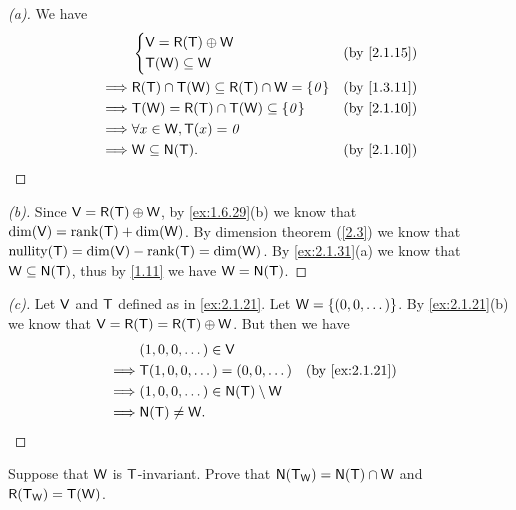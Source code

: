 \begin{proof}[(a)]
	We have
	\begin{align*}
		         & \begin{dcases}
			           \V = \rg{\T} \oplus \W \\
			           \T(\W) \subseteq \W
		           \end{dcases}                                 &  & \by{2.1.15}              \\
		\implies & \rg{\T} \cap \T(\W) \subseteq \rg{\T} \cap \W = \set{\zv} &  & \by{1.3.11} \\
		\implies & \T(\W) = \rg{\T} \cap \T(\W) \subseteq \set{\zv}          &  & \by{2.1.10} \\
		\implies & \forall x \in \W, \T(x) = \zv                                              \\
		\implies & \W \subseteq \ns{\T}.                                     &  & \by{2.1.10}
	\end{align*}
\end{proof}

\begin{proof}[(b)]
	Since \(\V = \rg{\T} \oplus \W\), by \cref{ex:1.6.29}(b) we know that \(\dim(\V) = \rk{\T} + \dim(\W)\).
	By dimension theorem (\cref{2.3}) we know that \(\nt{\T} = \dim(\V) - \rk{\T} = \dim(\W)\).
	By \cref{ex:2.1.31}(a) we know that \(\W \subseteq \ns{\T}\), thus by \cref{1.11} we have \(\W = \ns{\T}\).
\end{proof}

\begin{proof}[(c)]
	Let \(\mathsf{V}\) and \(\mathsf{T}\) defined as in \cref{ex:2.1.21}.
	Let \(\mathsf{W} = \left\lbrace(0, 0, \dots)\right\rbrace\).
	By \cref{ex:2.1.21}(b) we know that \(\V = \rg{\T} = \rg{\T} \oplus \W\).
	But then we have
	\begin{align*}
		         & (1, 0, 0, \dots) \in \V                                       \\
		\implies & \T(1, 0, 0, \dots) = (0, 0, \dots)        &  & \by{ex:2.1.21} \\
		\implies & (1, 0, 0, \dots) \in \ns{\T} \setminus \W                     \\
		\implies & \ns{\T} \neq \W.
	\end{align*}
\end{proof}

\begin{ex}\label{ex:2.1.32}
	Suppose that \(\mathsf{W}\) is \(\mathsf{T}\)-invariant.
	Prove that \(\ns{\T_{\W}} = \ns{\T} \cap \W\) and \(\rg{\T_{\W}} = \T(\W)\).
\end{ex}

